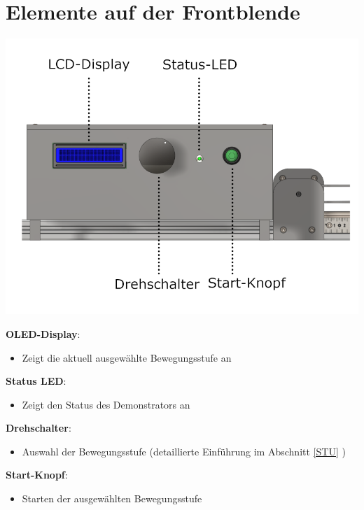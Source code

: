 %
%

\chapter{Elemente auf der Frontblende}
\begin{center}
	
	\includegraphics[width=\textwidth]{Images/Konstruktion2.png}
\end{center}

	\textbf{OLED-Display}: 
\begin{itemize}
	\item Zeigt die aktuell ausgewählte Bewegungsstufe an
\end{itemize}

	\textbf{Status LED}: 
\begin{itemize}
	\item Zeigt den Status des Demonstrators an
\end{itemize}

	\textbf{Drehschalter}: 
\begin{itemize}
	\item Auswahl der Bewegungsstufe (detaillierte Einführung im Abschnitt \ref{STU} )
\end{itemize}

	\textbf{Start-Knopf}: 
\begin{itemize}
	\item Starten der ausgewählten Bewegungsstufe
\end{itemize}
